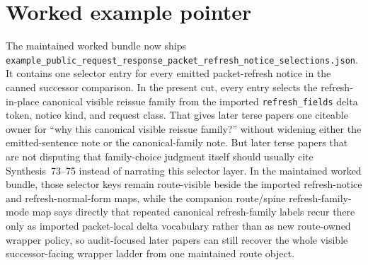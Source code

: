 \documentclass[11pt]{article}
\begin{document}
\section{Worked example pointer}
The maintained worked bundle now ships \nolinkurl{example_public_request_response_packet_refresh_notice_selections.json}.\cite{series:workedexample}
It contains one selector entry for every emitted packet-refresh notice in the canned successor comparison. In the present cut, every entry selects the refresh-in-place canonical visible reissue family from the imported \texttt{refresh\_fields} delta token, notice kind, and request class. That gives later terse papers one citeable owner for ``why this canonical visible reissue family?'' without widening either the emitted-sentence note or the canonical-family note. But later terse papers that are not disputing that family-choice judgment itself should usually cite Synthesis~73--75 instead of narrating this selector layer. In the maintained worked bundle, those selector keys remain route-visible beside the imported refresh-notice and refresh-normal-form maps, while the companion route/spine refresh-family-mode map says directly that repeated canonical refresh-family labels recur there only as imported packet-local delta vocabulary rather than as new route-owned wrapper policy, so audit-focused later papers can still recover the whole visible successor-facing wrapper ladder from one maintained route object.
\end{document}
